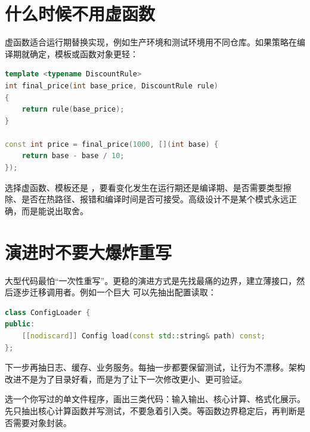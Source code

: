 \section{什么时候不用虚函数}

虚函数适合运行期替换实现，例如生产环境和测试环境用不同仓库。如果策略在编译期就确定，模板或函数对象更轻：

\begin{lstlisting}[language=C++,caption={编译期策略组合}]
template <typename DiscountRule>
int final_price(int base_price, DiscountRule rule)
{
    return rule(base_price);
}

const int price = final_price(1000, [](int base) {
    return base - base / 10;
});
\end{lstlisting}

选择虚函数、模板还是 ，要看变化发生在运行期还是编译期、是否需要类型擦除、是否在热路径、报错和编译时间是否可接受。高级设计不是某个模式永远正确，而是能说出取舍。

\section{演进时不要大爆炸重写}

大型代码最怕“一次性重写”。更稳的演进方式是先找最痛的边界，建立薄接口，然后逐步迁移调用者。例如一个巨大  可以先抽出配置读取：

\begin{lstlisting}[language=C++,caption={先抽出一个窄能力}]
class ConfigLoader {
public:
    [[nodiscard]] Config load(const std::string& path) const;
};
\end{lstlisting}

下一步再抽日志、缓存、业务服务。每抽一步都要保留测试，让行为不漂移。架构改进不是为了目录好看，而是为了让下一次修改更小、更可验证。

\begin{exercisebox}
选一个你写过的单文件程序，画出三类代码：输入输出、核心计算、格式化展示。先只抽出核心计算函数并写测试，不要急着引入类。等函数边界稳定后，再判断是否需要对象封装。
\end{exercisebox}
